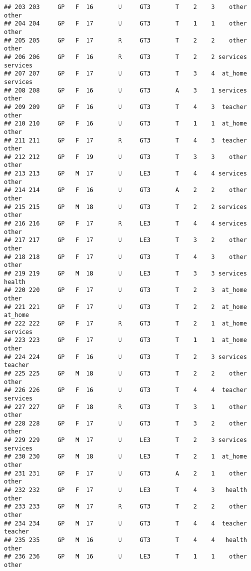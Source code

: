\documentclass[]{article}
\begin{document}
\begin{verbatim}
## 203 203     GP   F  16       U     GT3       T    2    3    other    other
## 204 204     GP   F  17       U     GT3       T    1    1    other    other
## 205 205     GP   F  17       R     GT3       T    2    2    other    other
## 206 206     GP   F  16       R     GT3       T    2    2 services services
## 207 207     GP   F  17       U     GT3       T    3    4  at_home services
## 208 208     GP   F  16       U     GT3       A    3    1 services    other
## 209 209     GP   F  16       U     GT3       T    4    3  teacher    other
## 210 210     GP   F  16       U     GT3       T    1    1  at_home    other
## 211 211     GP   F  17       R     GT3       T    4    3  teacher    other
## 212 212     GP   F  19       U     GT3       T    3    3    other    other
## 213 213     GP   M  17       U     LE3       T    4    4 services    other
## 214 214     GP   F  16       U     GT3       A    2    2    other    other
## 215 215     GP   M  18       U     GT3       T    2    2 services    other
## 216 216     GP   F  17       R     LE3       T    4    4 services    other
## 217 217     GP   F  17       U     LE3       T    3    2    other    other
## 218 218     GP   F  17       U     GT3       T    4    3    other    other
## 219 219     GP   M  18       U     LE3       T    3    3 services   health
## 220 220     GP   F  17       U     GT3       T    2    3  at_home    other
## 221 221     GP   F  17       U     GT3       T    2    2  at_home  at_home
## 222 222     GP   F  17       R     GT3       T    2    1  at_home services
## 223 223     GP   F  17       U     GT3       T    1    1  at_home    other
## 224 224     GP   F  16       U     GT3       T    2    3 services  teacher
## 225 225     GP   M  18       U     GT3       T    2    2    other    other
## 226 226     GP   F  16       U     GT3       T    4    4  teacher services
## 227 227     GP   F  18       R     GT3       T    3    1    other    other
## 228 228     GP   F  17       U     GT3       T    3    2    other    other
## 229 229     GP   M  17       U     LE3       T    2    3 services services
## 230 230     GP   M  18       U     LE3       T    2    1  at_home    other
## 231 231     GP   F  17       U     GT3       A    2    1    other    other
## 232 232     GP   F  17       U     LE3       T    4    3   health    other
## 233 233     GP   M  17       R     GT3       T    2    2    other    other
## 234 234     GP   M  17       U     GT3       T    4    4  teacher  teacher
## 235 235     GP   M  16       U     GT3       T    4    4   health    other
## 236 236     GP   M  16       U     LE3       T    1    1    other    other

\end{verbatim}
\end{document}
